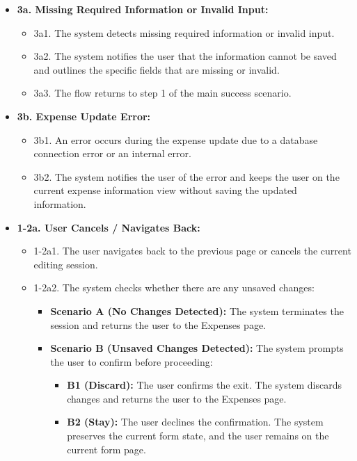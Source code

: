 \begin{itemize} [label={}, leftmargin=0.75cm, noitemsep]

    \item \textbf{3a. Missing Required Information or Invalid Input:}
    \begin{itemize} [label={}, leftmargin=0.75cm, noitemsep]
        \item 3a1. The system detects missing required information or invalid input.
        \item 3a2. The system notifies the user that the information cannot be saved and outlines the specific fields that are missing or invalid.
        \item 3a3. The flow returns to step 1 of the main success scenario.
    \end{itemize}

    \item \textbf{3b. Expense Update Error:}
    \begin{itemize} [label={}, leftmargin=0.75cm, noitemsep]
        \item 3b1. An error occurs during the expense update due to a database connection error or an internal error.
        \item 3b2. The system notifies the user of the error and keeps the user on the current expense information view without saving the updated information.
    \end{itemize}

    \item \textbf{1-2a. User Cancels / Navigates Back:}
    \begin{itemize} [label={}, leftmargin=0.75cm, noitemsep]
        \item 1-2a1. The user navigates back to the previous page or cancels the current editing session.
        \item 1-2a2. The system checks whether there are any unsaved changes:
        \begin{itemize} [label={}, leftmargin=0.75cm, noitemsep]
            \item \textbf{Scenario A (No Changes Detected):} The system terminates the session and returns the user to the Expenses page.
            \item \textbf{Scenario B (Unsaved Changes Detected):} The system prompts the user to confirm before proceeding:
            \begin{itemize} [label={}, leftmargin=0.75cm, noitemsep]
                \item \textbf{B1 (Discard):} The user confirms the exit. The system discards changes and returns the user to the Expenses page.
                \item \textbf{B2 (Stay):} The user declines the confirmation. The system preserves the current form state, and the user remains on the current form page.
            \end{itemize}
        \end{itemize}
    \end{itemize}

\end{itemize}

\vspace{0.3cm}
